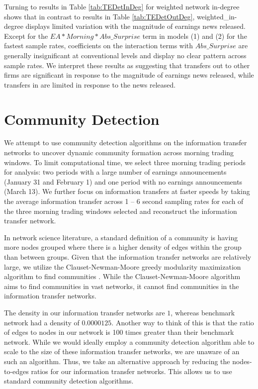 Turning to results in Table \ref{tab:TEDetInDeg} for weighted network in-degree shows that in contrast to results in Table \ref{tab:TEDetOutDeg},  weighted\_in-degree displays limited variation with the magnitude of earnings news released. Except for the \(EA*Morning*Abs\_Surprise\) term in models (1) and (2) for the fastest sample rates, coefficients on the interaction terms with \(Abs\_Surprise\) are generally insignificant at conventional levels and display no clear pattern across sample rates. We interpret these results as suggesting that transfers out to other firms are significant in response to the magnitude of earnings news released, while transfers in are limited in response to the news released.

\section{Community Detection}

We attempt to use community detection algorithms on the information transfer networks to uncover dynamic community formation across morning trading windows.  To limit computational time, we select three morning trading periods for analysis: two periods with a large number of earnings announcements (January 31 and February 1) and one period with no earnings announcements (March 13). We further focus on information transfers at faster speeds by taking the average information transfer across 1 – 6 second sampling rates for each of the three morning trading windows selected and reconstruct the information transfer network.  

In network science literature,  a standard definition of a community is having more nodes grouped where there is a higher density of edges within the group than between groups.  Given that the information transfer networks are relatively large, we utilize the Clauset-Newman-Moore greedy modularity maximization algorithm to find communities \citep[see][]{Clauset2005}.  While the Clauset-Newman-Moore algorithm aims to find communities in vast networks, it cannot find communities in the information transfer networks. 

The density in our information transfer networks are \(1\), whereas \cite{Clauset2005} benchmark network had a density of \(0.0000125\). Another way to think of this is that the ratio of edges to nodes in our network is 100 times greater than their benchmark network.  While we would ideally employ a community detection algorithm able to scale to the size of these information transfer networks, we are unaware of an such an algorithm.  Thus, we take an alternative approach by reducing the nodes-to-edges ratios for our information transfer networks. This allows us to use standard community detection algorithms.  

